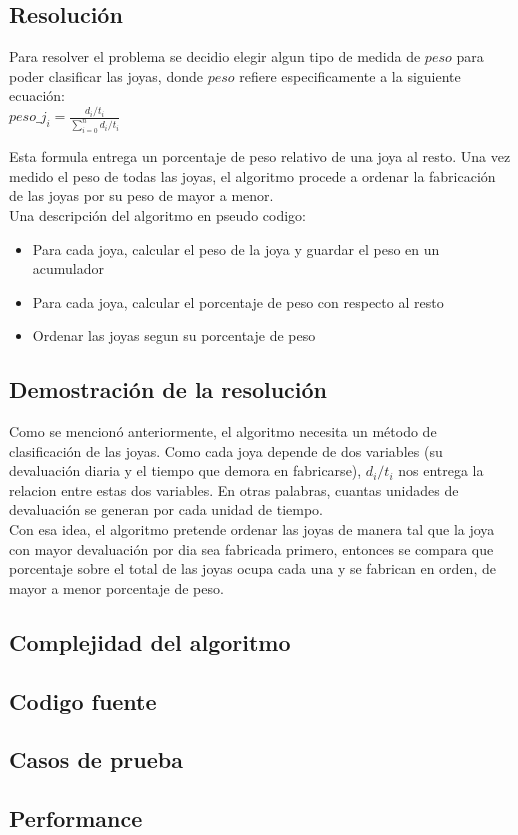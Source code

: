 \subsection{Resoluci\'on}

Para resolver el problema se decidio elegir algun tipo de medida de $peso$ para poder clasificar las joyas, donde $peso$ refiere especificamente a la siguiente ecuaci\'on: \\

$peso\_j_{i} = \frac{d_{i} / t_{i}}{\sum\limits_{i=0}^n d_{i} / t_{i}}$

Esta formula entrega un porcentaje de peso relativo de una joya al resto. Una vez medido el peso de todas las joyas, el algoritmo procede a ordenar la fabricaci\'on de las joyas por su peso de mayor a menor. \\

Una descripci\'on del algoritmo en pseudo codigo:

\begin{itemize}
\item Para cada joya, calcular el peso de la joya y guardar el peso en un acumulador
\item Para cada joya, calcular el porcentaje de peso con respecto al resto
\item Ordenar las joyas segun su porcentaje de peso
\end{itemize}

\subsection{Demostraci\'on de la resoluci\'on}

Como se mencion\'o anteriormente, el algoritmo necesita un m\'etodo de clasificaci\'on de las joyas. Como cada joya depende de dos variables (su devaluaci\'on diaria y el tiempo que demora en fabricarse), $d_{i}/t_{i}$ nos entrega la relacion entre estas dos variables. En otras palabras, cuantas unidades de devaluaci\'on se generan por cada unidad de tiempo. \\

Con esa idea, el algoritmo pretende ordenar las joyas de manera tal que la joya con mayor devaluaci\'on por dia sea fabricada primero, entonces se compara que porcentaje sobre el total de las joyas ocupa cada una y se fabrican en orden, de mayor a menor porcentaje de peso.

\subsection{Complejidad del algoritmo}

\subsection{Codigo fuente}

\subsection{Casos de prueba}

\subsection{Performance}
